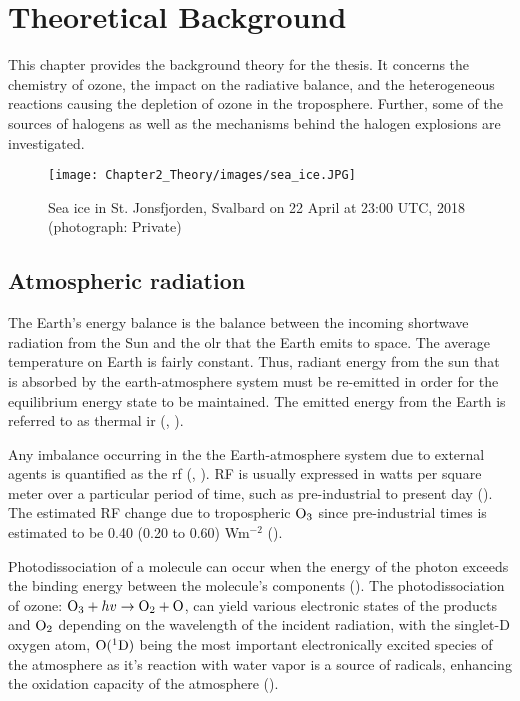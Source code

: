 \setcounter{chapter}{1} 
\chapter{Theoretical Background} \label{ch:theoretical_back}

This chapter provides the background theory for the thesis. It concerns the chemistry of ozone, the impact on the radiative balance, and the heterogeneous reactions causing the depletion of ozone in the troposphere. Further, some of the sources of halogens as well as the mechanisms behind the halogen explosions are investigated. 

\begin{figure}
    \centering
    \texttt{[image: Chapter2\_Theory/images/sea\_ice.JPG]}
    \caption{Sea ice in St. Jonsfjorden, Svalbard on 22 April at 23:00 UTC, 2018 (photograph: Private)}
    \label{fig:sea_ice}
\end{figure}


\section{Atmospheric radiation}\label{sec:atm_rad}

The Earth's energy balance is the balance between the incoming shortwave radiation from the Sun and the \acrfull{olr} that the Earth emits to space. The average temperature on Earth is fairly constant. Thus, radiant energy from the sun that is absorbed by the earth-atmosphere system must be re-emitted in order for the equilibrium energy state to be maintained. The emitted energy from the Earth is referred to as thermal \acrfull{ir} (\cite{Liou_AtmRad}, \cite{SeinfeldSpyros}). 

\medskip

Any imbalance occurring in the the Earth-atmosphere system due to external agents is quantified as the \acrfull{rf} (\cite{IPCCchapter8}, \cite{Bowman2013}). RF is usually expressed in watts per square meter over a particular period of time, such as pre-industrial to present day (\cite{IPCCchapter8}). The estimated RF change due to tropospheric $\mathrm{O_3}$ since pre-industrial times is estimated to be 0.40 (0.20 to 0.60) Wm$^{-2}$ (\cite{IPCCchapter8}). 


\medskip

Photodissociation of a molecule can occur when the energy of the photon exceeds the binding energy between the molecule's components (\cite{SeinfeldSpyros}). The photodissociation of ozone: $\mathrm{O_3} + hv \rightarrow \mathrm{O_2} + \mathrm{O}$, can yield various electronic states of the products  and $\mathrm{O_2}$ depending on the wavelength of the incident radiation, with the singlet-D oxygen atom, $\mathrm{O}(^1\mathrm{D})$ being the most important electronically excited species of the atmosphere as it's reaction with water vapor is a source of  radicals, enhancing the oxidation capacity of the atmosphere (\cite{SeinfeldSpyros}).


